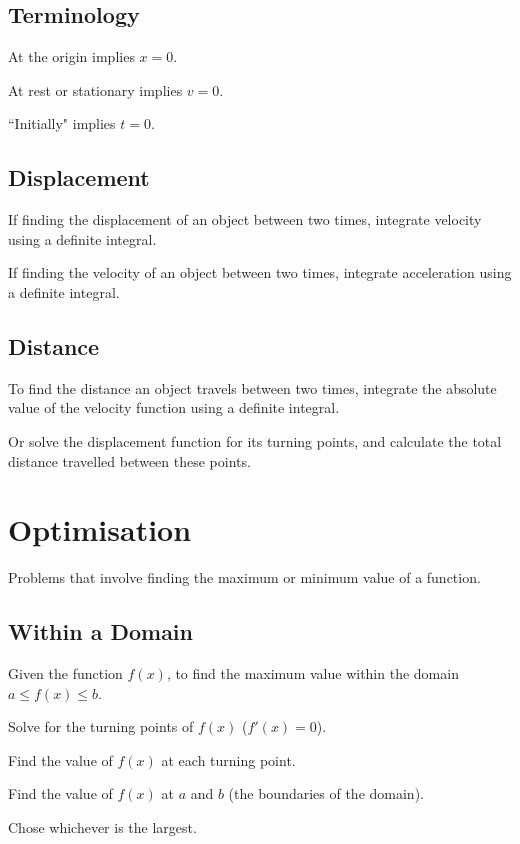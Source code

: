 \documentclass[a4paper,11pt]{article}
\begin{document}
\subsection{Terminology}

At the origin implies $x = 0$.

At rest or stationary implies $v = 0$.

``Initially" implies $t = 0$.


\subsection{Displacement}

If finding the displacement of an object between two times, integrate velocity
using a definite integral.

If finding the velocity of an object between two times, integrate acceleration
using a definite integral.


\subsection{Distance}

To find the distance an object travels between two times, integrate the absolute
value of the velocity function using a definite integral.

Or solve the displacement function for its turning points, and calculate the
total distance travelled between these points.




\section{Optimisation}

Problems that involve finding the maximum or minimum value of a function.


\subsection{Within a Domain}

Given the function $f(x)$, to find the maximum value within the domain
$a \leq f(x) \leq b$.

Solve for the turning points of $f(x)$ ($f'(x) = 0$).

Find the value of $f(x)$ at each turning point.

Find the value of $f(x)$ at $a$ and $b$ (the boundaries of the domain).

Chose whichever is the largest.
\end{document}
